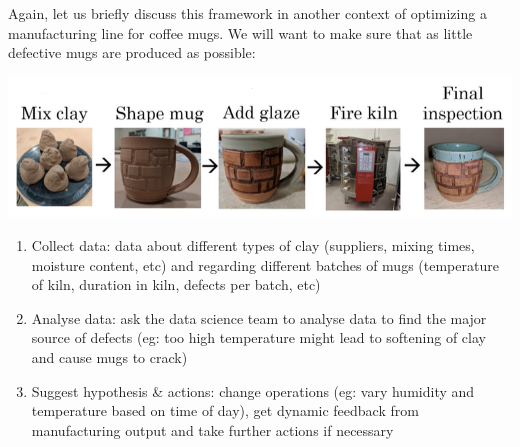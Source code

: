 \documentclass{article}[a4paper,12pt]
\theoremstyle{definition}
\begin{document}
Again, let us briefly discuss this framework in another context of optimizing a manufacturing line for coffee mugs. We will want to make sure that as little defective mugs are produced as possible:
\begin{center}\includegraphics[scale=0.9]{manufacturing_steps.png}\end{center}
\begin{enumerate}
	\item Collect data: data about different types of clay (suppliers, mixing times, moisture content, etc) and regarding different batches of mugs (temperature of kiln, duration in kiln, defects per batch, etc)
 	\item Analyse data: ask the data science team to analyse data to find the major source of defects (eg: too high temperature might lead to softening of clay and cause mugs to crack)
	\item Suggest hypothesis \& actions: change operations (eg: vary humidity and temperature based on time of day), get dynamic feedback from manufacturing output and take further actions if necessary
\end{enumerate}
\end{document}
